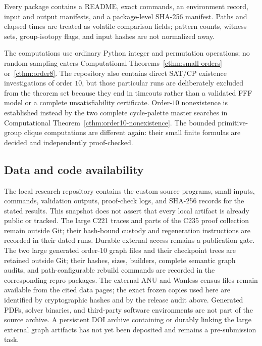 Every package contains a README, exact commands, an environment record, input
and output manifests, and a package-level SHA-256 manifest.  Paths and elapsed
times are treated as volatile comparison fields; pattern counts, witness
sets, group-isotopy flags, and input hashes are not normalized away.

The computations use ordinary Python integer and permutation operations; no
random sampling enters Computational Theorems~\ref{cthm:small-orders}
or~\ref{cthm:order8}.  The repository also contains direct SAT/CP existence
investigations of order $10$, but those particular runs are deliberately
excluded from the theorem set because they end in timeouts rather than a
validated FFF model or a complete unsatisfiability certificate.  Order-$10$
nonexistence is established instead by the two complete cycle-palette master
searches in Computational Theorem~\ref{cthm:order10-nonexistence}.  The bounded
primitive-group clique computations are different again: their small finite
formulas are decided and independently proof-checked.

\subsection*{Data and code availability}
The local research repository contains the custom source programs,
small inputs, commands, validation outputs, proof-check logs, and
SHA-256 records for the stated results. This snapshot does not assert
that every local artifact is already public or tracked. The large C221
traces and parts of the C235 proof collection remain outside Git;
their hash-bound custody and regeneration instructions are recorded
in their dated runs. Durable external access remains a publication
gate. The two large generated
order-$10$ graph files and their checkpoint trees are retained outside Git;
their hashes, sizes, builders, complete semantic graph audits, and path-configurable
rebuild commands are recorded in the corresponding repro packages.  The
external ANU and Wanless census files remain available from the cited data
pages; the exact frozen copies used here are identified by cryptographic
hashes and by the release audit above.  Generated PDFs, solver binaries, and
third-party software environments are not part of the source archive.  A
persistent DOI archive containing or durably linking the large external graph
artifacts has not yet been deposited and remains a pre-submission task.
